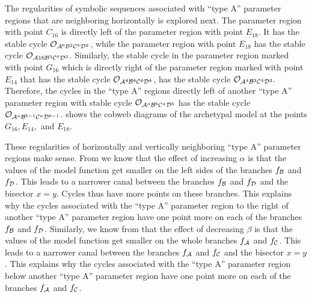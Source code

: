 The regularities of symbolic sequences associated with ``type A'' parameter regions that are neighboring horizontally is explored next.
The parameter region with point $C_{16}$ is directly left of the parameter region with point $E_{18}$.
It has the stable cycle $\mathcal{O}_{\mathcal{A}^6\mathcal{B}^2\mathcal{C}^6\mathcal{D}^2}$, while the parameter region with point $E_{18}$ has the stable cycle $\mathcal{O}_{\mathcal{A}16\mathcal{B}^3\mathcal{C}^6\mathcal{D}^3}$.
Similarly, the stable cycle in the parameter region marked with point $G_{16}$ which is directly right of the parameter region marked with point $E_{14}$ that has the stable cycle $\mathcal{O}_{\mathcal{A}^4\mathcal{B}^4\mathcal{C}^4\mathcal{D}^4}$, has the stable cycle $\mathcal{O}_{\mathcal{A}^4\mathcal{B}^3\mathcal{C}^4\mathcal{D}^3}.$
Therefore, the cycles in the ``type A'' regions directly left of another ``type A'' parameter region with stable cycle $\mathcal{O}_{\mathcal{A}^a\mathcal{B}^b\mathcal{C}^a\mathcal{D}^b}$ has the stable cycle $\mathcal{O}_{\mathcal{A}^a\mathcal{B}^{b-1}\mathcal{C}^a\mathcal{D}^{b-1}}$.
 shows the cobweb diagrams of the archetypal model at the points $G_{16}, E_{14},$ and $E_{18}$.

These regularities of horizontally and vertically neighboring ``type A'' parameter regions make sense.
From  we know that the effect of increasing $\alpha$ is that the values of the model function get smaller on the left sides of the branches $f_{\mathcal{B}}$ and $f_{\mathcal{D}}$.
This leads to a narrower canal between the branches $f_{\mathcal{B}}$ and $f_{\mathcal{D}}$ and the bisector $x = y$.
Cycles thus have more points on these branches.
This explains why the cycles associated with the ``type A'' parameter region to the right of another ``type A'' parameter region have one point more on each of the branches $f_{\mathcal{B}}$ and $f_{\mathcal{D}}$.
Similarly, we know from  that the effect of decreasing $\beta$ is that the values of the model function get smaller on the whole branches $f_{\mathcal{A}}$ and $f_{\mathcal{C}}$.
This leads to a narrower canal between the branches $f_{\mathcal{A}}$ and $f_{\mathcal{C}}$ and the bisector $x = y$.
This explains why the cycles associated with the ``type A'' parameter region below another ``type A'' parameter region have one point more on each of the branches $f_{\mathcal{A}}$ and $f_{\mathcal{C}}$.
